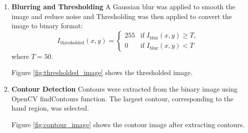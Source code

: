 \begin{enumerate}
    \item \textbf{Blurring and Thresholding}
    A Gaussian blur was applied to smooth the image and reduce noise and Thresholding was then applied to convert the image to binary format:
    \begin{equation}
        I_{\text{thresholded}}(x, y) =
        \begin{cases}
        255 & \text{if } I_{\text{blur}}(x, y) \geq T, \\
        0 & \text{if } I_{\text{blur}}(x, y) < T
        \end{cases}   
    \end{equation} 
    where \( T = 50 \).

    Figure \ref{fig:thresholded_image} shows the thresholded image.

    \item \textbf{Contour Detection}
    Contours were extracted from the binary image using OpenCV findContours function. The largest contour, corresponding to the hand region, was selected. 
   
    Figure \ref{fig:contour_image} shows the contour image after extracting contours.
    

\end{enumerate}
